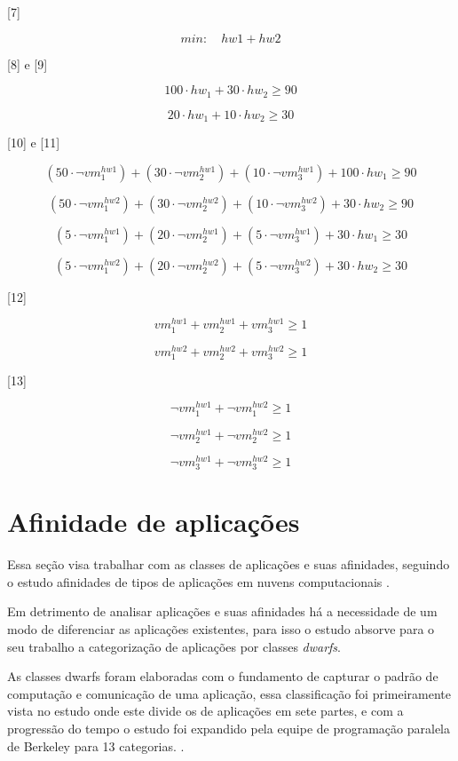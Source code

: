 [7]

$$min: \quad hw1 + hw2 $$

[8] e [9]

$$100 \cdot hw_1 + 30 \cdot hw_2 \geq 90$$ 


$$20 \cdot hw_1 + 10 \cdot hw_2 \geq 30$$ 


[10] e [11]

$$ (50 \cdot \lnot{vm_1^{hw1}}) + (30  \cdot \lnot{vm_2^{hw1}}) + (10  \cdot \lnot{vm_3^{hw1}}) + 100 \cdot hw_1 \geq 90 $$ 

$$ (50 \cdot \lnot{vm_1^{hw2}}) + (30  \cdot \lnot{vm_2^{hw2}}) + (10  \cdot \lnot{vm_3^{hw2}}) + 30 \cdot hw_2 \geq 90 $$ 


$$ (5 \cdot \lnot{vm_1^{hw1}}) + (20  \cdot \lnot{vm_2^{hw1}}) + (5  \cdot \lnot{vm_3^{hw1}}) + 30 \cdot hw_1 \geq 30 $$ 


$$ (5 \cdot \lnot{vm_1^{hw2}}) + (20  \cdot \lnot{vm_2^{hw2}}) + (5  \cdot \lnot{vm_3^{hw2}}) + 30 \cdot hw_2 \geq 30 $$

[12]

$$ vm_1^{hw1} + vm_2^{hw1} + vm_3^{hw1} \geq 1 $$


$$ vm_1^{hw2} + vm_2^{hw2} + vm_3^{hw2} \geq 1 $$

[13]
 
$$ \lnot{vm_1^{hw1}} + \lnot{vm_1^{hw2}} \geq 1$$

$$ \lnot{vm_2^{hw1}} + \lnot{vm_2^{hw2}} \geq 1$$

$$ \lnot{vm_3^{hw1}} + \lnot{vm_3^{hw2}} \geq 1$$


\section{Afinidade de aplicações}

Essa seção visa trabalhar com as classes de aplicações e suas afinidades, seguindo o estudo afinidades de tipos de aplicações em nuvens computacionais \cite{fabio2014}.

Em detrimento de analisar aplicações e suas afinidades há a necessidade de um modo de diferenciar as aplicações existentes, para isso o estudo \cite{fabio2014} absorve para o seu trabalho a categorização de aplicações por classes  \textit{dwarfs}.

As classes dwarfs foram elaboradas com o fundamento de capturar o padrão de computação e comunicação de uma aplicação, essa classificação foi primeiramente vista no estudo \cite{colella2014} onde este divide os de aplicações em sete partes, e com a progressão do tempo o estudo foi expandido pela equipe de programação paralela de Berkeley para 13 categorias. \cite{asanovic2006}.


